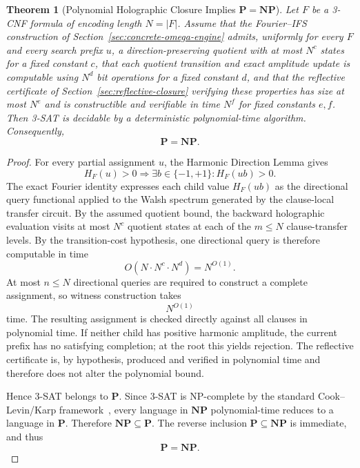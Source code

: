 \documentclass[11pt]{article}
\theoremstyle{plain}
\newtheorem{theorem}{Theorem}[section]
\theoremstyle{definition}
\begin{document}
\begin{theorem}[Polynomial Holographic Closure Implies $\mathbf{P}=\mathbf{NP}$]
\label{thm:holographic-closure-pnp}
Let $F$ be a 3-CNF formula of encoding length $N=|F|$.  Assume that the Fourier--IFS construction of Section~\ref{sec:concrete-omega-engine} admits, uniformly for every $F$ and every search prefix $u$, a direction-preserving quotient with at most $N^c$ states for a fixed constant $c$, that each quotient transition and exact amplitude update is computable using $N^d$ bit operations for a fixed constant $d$, and that the reflective certificate of Section~\ref{sec:reflective-closure} verifying these properties has size at most $N^e$ and is constructible and verifiable in time $N^f$ for fixed constants $e,f$.  Then 3-SAT is decidable by a deterministic polynomial-time algorithm.  Consequently,
\[
\boxed{\mathbf{P}=\mathbf{NP}}.
\]
\end{theorem}

\begin{proof}
For every partial assignment $u$, the Harmonic Direction Lemma gives
\[
H_F(u)>0
\Longrightarrow
\exists b\in\{-1,+1\}: H_F(ub)>0.
\]
The exact Fourier identity expresses each child value $H_F(ub)$ as the directional query functional applied to the Walsh spectrum generated by the clause-local transfer circuit.  By the assumed quotient bound, the backward holographic evaluation visits at most $N^c$ quotient states at each of the $m\leq N$ clause-transfer levels.  By the transition-cost hypothesis, one directional query is therefore computable in time
\[
O\!\left(N\cdot N^c\cdot N^d\right)
=
N^{O(1)}.
\]
At most $n\leq N$ directional queries are required to construct a complete assignment, so witness construction takes
\[
N^{O(1)}
\]
time.  The resulting assignment is checked directly against all clauses in polynomial time.  If neither child has positive harmonic amplitude, the current prefix has no satisfying completion; at the root this yields rejection.  The reflective certificate is, by hypothesis, produced and verified in polynomial time and therefore does not alter the polynomial bound.

Hence 3-SAT belongs to $\mathbf{P}$.  Since 3-SAT is NP-complete by the standard Cook--Levin/Karp framework~\cite{Cook1971,Karp1972}, every language in $\mathbf{NP}$ polynomial-time reduces to a language in $\mathbf{P}$.  Therefore $\mathbf{NP}\subseteq\mathbf{P}$.  The reverse inclusion $\mathbf{P}\subseteq\mathbf{NP}$ is immediate, and thus
\[
\mathbf{P}=\mathbf{NP}.
\]
\end{proof}
\end{document}
